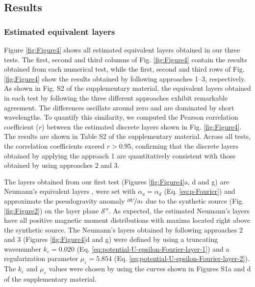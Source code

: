 \subsection{Results}

\subsubsection{Estimated equivalent layers}

Figure \ref{fig:Figure4} shows all estimated equivalent layers obtained in our three tests.
The first, second and third columns of Fig. \ref{fig:Figure4} contain the results obtained 
from each numerical test, while the first, second and third rows of Fig. \ref{fig:Figure4} 
show the results obtained by following approaches 1--3, respectively.
As shown in Fig. S2 of the supplementary material, the equivalent layers obtained in each test by 
following the three different approaches exhibit remarkable agreement.
The differences oscillate around zero and are dominated by short wavelengths.
To quantify this similarity, we computed the Pearson correlation coefficient ($r$) 
between the estimated discrete layers shown in Fig. \ref{fig:Figure4}. 
The results are shown in Table S2 of the supplementary material.
Across all tests, the correlation coefficients exceed $r > 0.95$, confirming that the discrete layers 
obtained by applying the approach 1 are quantitatively consistent with those obtained by using approaches 
2 and 3.

The layers obtained from our first test (Figures \ref{fig:Figure4}a, d and g) are Neumann's 
equivalent layers \cite{oliveirajr_etal2026_1}, 
were set with $\alpha_{a} = \alpha_{d}$ (Eq. \ref{eq:p-Fourier}) and approximate the
pseudogravity anomaly $\nicefrac{\partial U}{\partial z}$  
due to the synthetic source (Fig. \ref{fig:Figure2}) on the layer plane $\mathcal{S}''$.
As expected, the estimated Neumann's layers have all positive magnetic moment distributions 
with maxima located right above the synthetic source.
The Neumann's layers obtained by following approaches 2 and 3 
(Figures \ref{fig:Figure4}d and g) were defined by using a truncating wavenumber 
$k_{\varepsilon} = 0.020$ (Eq. \ref{eq:potential-U-epsilon-Fourier-layer-1})
and a regularization parameter $\mu_{\varepsilon} = 5.854$ 
(Eq. \ref{eq:potential-U-epsilon-Fourier-layer-2}). 
The $k_{\varepsilon}$ and $\mu_{\varepsilon}$ values were chosen by using the curves shown 
in Figures S1a and d of the supplementary material.

